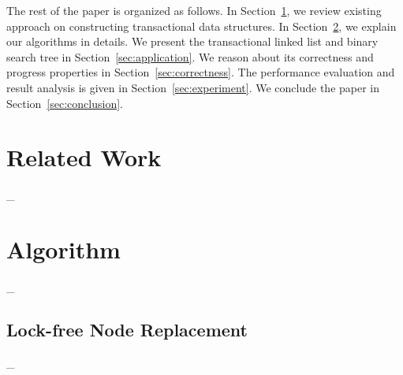 \documentclass[10pt,conference,compsocconf]{IEEEtran}
\begin{document}
The rest of the paper is organized as follows. 
In Section~\ref{sec:related}, we review existing approach on constructing transactional data structures.
In Section~\ref{sec:algorithm}, we explain our algorithms in details.
We present the transactional linked list and binary search tree in Section~\ref{sec:application}.
We reason about its correctness and progress properties in Section~\ref{sec:correctness}.
The performance evaluation and result analysis is given in Section~\ref{sec:experiment}.
We conclude the paper in Section~\ref{sec:conclusion}.

\section{Related Work}
\label{sec:related}
\_












\section{Algorithm}
\label{sec:algorithm}
\_

\subsection{Lock-free Node Replacement}
\label{sec:noderepl}
\_
\end{document}
